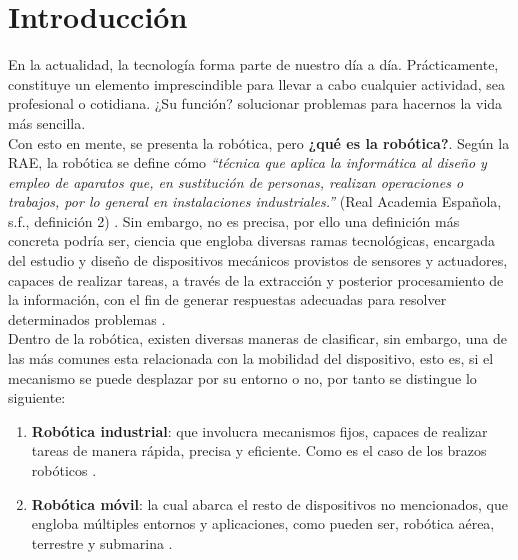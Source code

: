 \chapter{Introducción}
\label{cap:capitulo1}
\setcounter{page}{1}

En la actualidad, la tecnología forma parte de nuestro día a día. Prácticamente, constituye un elemento imprescindible para llevar a cabo cualquier actividad, sea profesional o cotidiana. ¿Su función? solucionar problemas para hacernos la vida más sencilla.\\

Con esto en mente, se presenta la robótica, pero \textbf{¿qué es la robótica?}. Según la \ac{RAE}, la robótica se define cómo \emph{``técnica que aplica la informática al diseño y empleo de aparatos que, en sustitución de personas, realizan operaciones o trabajos, por lo general en instalaciones industriales.''} (Real Academia Española, s.f., definición 2) \cite{rae-robotica}. Sin embargo, no es precisa, por ello una definición más concreta podría ser, ciencia que engloba diversas ramas tecnológicas, encargada del estudio y diseño de dispositivos mecánicos provistos de sensores y actuadores, capaces de realizar tareas, a través de la extracción y posterior procesamiento de la información, con el fin de generar respuestas adecuadas para resolver determinados problemas \cite{revista-de-robots}.\\

Dentro de la robótica, existen diversas maneras de clasificar, sin embargo, una de las más comunes esta relacionada con la mobilidad del dispositivo, esto es, si el mecanismo se puede desplazar por su entorno o no, por tanto se distingue lo siguiente:

\begin{enumerate}
	\item \textbf{Robótica industrial}: que involucra mecanismos fijos, capaces de realizar tareas de manera rápida, precisa y eficiente. Como es el caso de los brazos robóticos \cite{industrial-robot}.

	\item \textbf{Robótica móvil}: la cual abarca el resto de dispositivos no mencionados, que engloba múltiples entornos y aplicaciones, como pueden ser, robótica aérea, terrestre y submarina \cite{mobile-robot}.
\end{enumerate}

